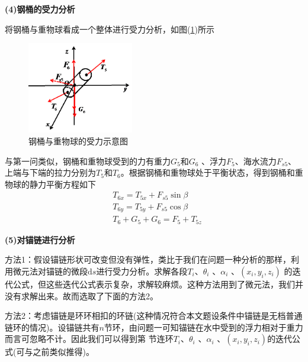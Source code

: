 \documentclass[UTF8]{ctexbook}
\theoremstyle{nonumberplain}
\begin{document}
            \par
            \textbf{(4)钢桶的受力分析}
            \par
            将钢桶与重物球看成一个整体进行受力分析，如图(\ref{钢桶与重物球的受力示意图})所示
            \begin{figure}[H]
            \centering
            \includegraphics[height=4cm]{images/Steel_pipe_and_weight_ball_force.jpg}
            \caption{钢桶与重物球的受力示意图}
            \label{钢桶与重物球的受力示意图}
            \end{figure}
            \par
            与第一问类似，钢桶和重物球受到的力有重力$G_5$和$G_6$ 、浮力$F_5$、海水流力$F_{s5}$、上端与下端的拉力分别为$T_5$和$T_6$。根据钢桶和重物球处于平衡状态，得到钢桶和重物球的静力平衡方程如下
            \begin{align*}
            & T_{6x} = T_{5x}+F_{s5}\sin \beta\\
            & T_{6y} = T_{5y}+F_{s5}\cos \beta\\
            & T_6 + G_5+G_6 = F_5+T_{5z}
            \end{align*}
            \par
            \textbf{(5)对锚链进行分析}
            \par
            方法1：假设锚链形状可改变但没有弹性，类比于我们在问题一种分析的那样，利用微元法对锚链的微段$\mathrm{d}s$进行受力分析。求解各段$T_i$、$\theta_i$ 、$\alpha_i$ 、$(x_i,y_i,z_i)$ 的迭代公式，但这些迭代公式表示复杂，求解较麻烦。这种方法用到了微元法，我们并没有求解出来。故而选取了下面的方法2。
            \par
            方法2：考虑锚链是环环相扣的环链(这种情况符合本文题设条件中锚链是无档普通链环的情况)。设锚链共有$n$节环，由问题一可知锚链在水中受到的浮力相对于重力而言可忽略不计。因此我们可以得到第 节连环$T_i$、$\theta_i$ 、$\alpha_i$ 、$(x_i,y_i,z_i)$的迭代公式(可与之前类似推得)。
\end{document}

